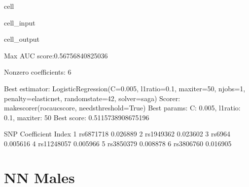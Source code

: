 \documentclass[letterpaper,10pt,english]{jupyterBook}
\begin{document}
\begin{sphinxuseclass}{cell}
\begin{sphinxVerbatimInput}
\begin{sphinxuseclass}{cell_input}
\end{sphinxuseclass}\end{sphinxVerbatimInput}
\begin{sphinxVerbatimOutput}

\begin{sphinxuseclass}{cell_output}
\begin{sphinxVerbatim}[commandchars=\\\{\}]
Max AUC score:0.56756840825036

Non\PYGZhy{}zero coefficients: 6

Best estimator: LogisticRegression(C=0.005, l1\PYGZus{}ratio=0.1, max\PYGZus{}iter=50, n\PYGZus{}jobs=\PYGZhy{}1,
                   penalty=\PYGZsq{}elasticnet\PYGZsq{}, random\PYGZus{}state=42, solver=\PYGZsq{}saga\PYGZsq{})
Scorer: make\PYGZus{}scorer(roc\PYGZus{}auc\PYGZus{}score, needs\PYGZus{}threshold=True)
Best params: \PYGZob{}\PYGZsq{}C\PYGZsq{}: 0.005, \PYGZsq{}l1\PYGZus{}ratio\PYGZsq{}: 0.1, \PYGZsq{}max\PYGZus{}iter\PYGZsq{}: 50\PYGZcb{}
Best score: 0.5115738908675196
\end{sphinxVerbatim}

\begin{sphinxVerbatim}[commandchars=\\\{\}]
              SNP Coefficient
Index                        
1       rs6871718   \PYGZhy{}0.026889
2       rs1949362   \PYGZhy{}0.023602
3          rs6964    0.005616
4      rs11248057    0.005966
5       rs3850379    0.008878
6       rs3806760    0.016905
\end{sphinxVerbatim}

\end{sphinxuseclass}\end{sphinxVerbatimOutput}

\end{sphinxuseclass}

\section{NN Males}
\label{\detokenize{Cooper:nn-males}}
\end{document}
